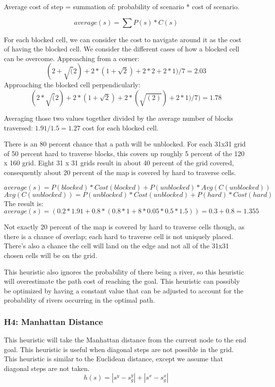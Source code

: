 Average cost of step = summation of: probability of scenario * cost of scenario.

\[average(s) = \sum{P(s)*C(s)}  \]

For each blocked cell, we can consider the cost to navigate around it as the cost of having the blocked cell. We consider the different cases of how a blocked cell can be overcome. 
Approaching from a corner: \[(2 + \sqrt(2) + 2 * ( 1 + \sqrt{2}) + 2 * 2 + 2 * 1) / 7  = 2.03\]
Approaching the blocked cell perpendicularly: \[ (2*\sqrt(2) + 2*(1 + \sqrt{2}) + 2 * (\sqrt{(2)}) + 2*1 )/ 7 ) = 1.78 \]

Averaging those two values together divided by the average number of blocks traversed: $1.91 / 1.5 = 1.27$ cost for each blocked cell.

There is an 80 percent chance that a path will be unblocked.
For each 31x31 grid of 50 percent hard to traverse blocks, this covers up roughly 5 percent of the 120 x 160 grid. Eight 31 x 31 grids result in about 40 percent of the grid covered, consequently about 20 percent of the map is covered by hard to traverse cells.


\[average(s) = P(blocked)*Cost(blocked) + P(unblocked)*Avg(C(unblocked)) \]
\[Avg(C(unblocked)) = P(unblocked)*Cost(unblocked) + P(hard)*Cost(hard)\]
The result is:
\[average(s) = (0.2 * 1.91 + 0.8 * ( 0.8 * 1 + 8*0.05*0.5*1.5 ) ) = 0.3 + 0.8 = 1.355\]

Not exactly 20 percent of the map is covered by hard to traverse cells though, as there is a chance of overlap; each hard to traverse cell is not uniquely placed. There's also a chance the cell will land on the edge and not all of the 31x31 chosen cells will be on the grid.

This heuristic also ignores the probability of there being a river, so this heuristic will overestimate the path cost of reaching the goal. This heuristic can possibly be optimized by having a constant value that can be adjusted to account for the probability of rivers occurring in the optimal path.

\subsubsection{H4: Manhattan Distance}
This heuristic will take the Manhattan distance from the current node to the end goal. This heuristic is useful when diagonal steps are not possible in the grid. This heuristic is similar to the Euclidean distance, except we assume that diagonal steps are not taken.
\[h(s) =  |s^y - s_g^y| + |s^x - s_g^x|\]

